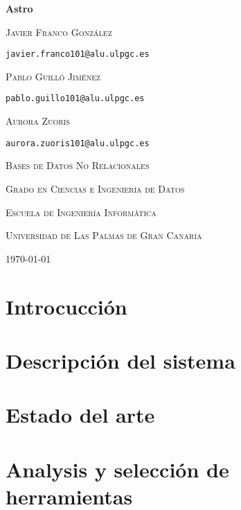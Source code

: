 \documentclass[spanish]{article}
\begin{document}
\begin{titlepage}
	\centering
	{\huge\bfseries Astro \par}
	\vspace{2cm}
	{\scshape\Large Javier Franco González \par\tt{javier.franco101@alu.ulpgc.es}\par}
	\vspace{1cm}
	{\scshape\Large Pablo Guilló Jiménez \par\tt{pablo.guillo101@alu.ulpgc.es}\par}
	\vspace{1cm}
	{\scshape\Large Aurora Zuoris \par\tt{aurora.zuoris101@alu.ulpgc.es}\par}
	\vspace{3cm}
	{\scshape\large Bases de Datos No Relacionales \par}
	\vspace{1cm}
	{\scshape\large Grado en Ciencias e Ingeniería de Datos\par}
	\vspace{1cm}
	{\scshape\large Escuela de Ingeniería Informática\par}
	\vspace{1cm}
	{\scshape\large Universidad de Las Palmas de Gran Canaria\par}
	\vspace{1cm}
	{\scshape\large \today{} \par}
\end{titlepage}

\tableofcontents

\section{Introcucción}

\section{Descripción del sistema}

\section{Estado del arte}

\section{Analysis y selección de herramientas}
\end{document}
